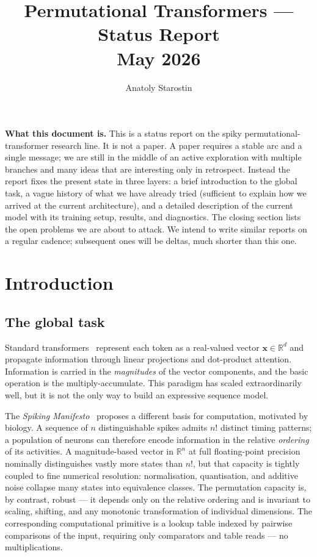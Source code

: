 \documentclass[11pt]{article}
\begin{document}
\title{\Large\textbf{Permutational Transformers --- Status Report}\\[2pt]
\large May 2026}

\author{Anatoly Starostin}
\date{}

\maketitle

\noindent\textbf{What this document is.}
This is a status report on the spiky permutational-transformer research line.
It is not a paper.
A paper requires a stable arc and a single message; we are still in the middle of an active exploration with multiple branches and many ideas that are interesting only in retrospect.
Instead the report fixes the present state in three layers: a brief introduction to the global task, a vague history of what we have already tried (sufficient to explain how we arrived at the current architecture), and a detailed description of the current model with its training setup, results, and diagnostics.
The closing section lists the open problems we are about to attack.
We intend to write similar reports on a regular cadence; subsequent ones will be deltas, much shorter than this one.


\section{Introduction}
\label{sec:intro}

\subsection{The global task}

Standard transformers~\cite{ref:vaswani} represent each token as a real-valued vector $\mathbf{x} \in \mathbb{R}^d$ and propagate information through linear projections and dot-product attention.
Information is carried in the \emph{magnitudes} of the vector components, and the basic operation is the multiply-accumulate.
This paradigm has scaled extraordinarily well, but it is not the only way to build an expressive sequence model.

The \emph{Spiking Manifesto}~\cite{ref:manifesto} proposes a different basis for computation, motivated by biology.
A sequence of $n$ distinguishable spikes admits $n!$ distinct timing patterns; a population of neurons can therefore encode information in the relative \emph{ordering} of its activities.
A magnitude-based vector in $\mathbb{R}^n$ at full floating-point precision nominally distinguishes vastly more states than $n!$, but that capacity is tightly coupled to fine numerical resolution: normalisation, quantisation, and additive noise collapse many states into equivalence classes.
The permutation capacity is, by contrast, robust --- it depends only on the relative ordering and is invariant to scaling, shifting, and any monotonic transformation of individual dimensions.
The corresponding computational primitive is a lookup table indexed by pairwise comparisons of the input, requiring only comparators and table reads --- no multiplications.
\end{document}
